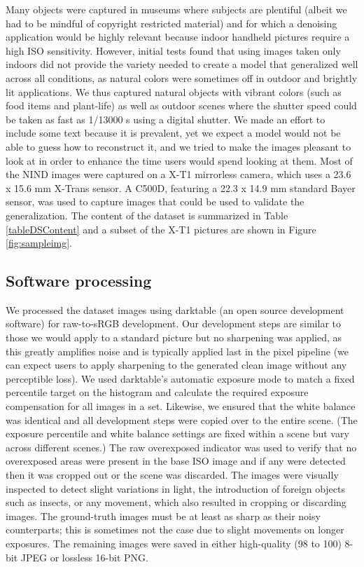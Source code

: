 Many objects were captured in museums where subjects are plentiful (albeit we had to be mindful of copyright restricted material) and for which a denoising application would be highly relevant because indoor handheld pictures require a high ISO sensitivity. However, initial tests found that using images taken only indoors did not provide the variety needed to create a model that generalized well across all conditions, as natural colors were sometimes off in outdoor and brightly lit applications. We thus captured natural objects with vibrant colors (such as food items and plant-life) as well as outdoor scenes where the shutter speed could be taken as fast as 1/13000 s using a digital shutter. We made an effort to include some text because it is prevalent, yet we expect a model would not be able to guess how to reconstruct it, and we tried to make the images pleasant to look at in order to enhance the time users would spend looking at them. Most of the NIND images were captured on a \acl{X-T1} mirrorless camera, which uses a 23.6 x 15.6 mm X-Trans sensor. A \ac{C500D}, featuring a 22.3 x 14.9 mm standard Bayer sensor, was used to capture images that could be used to validate the generalization. The content of the dataset is summarized in Table \ref{tableDSContent} and a subset of the \acs{X-T1} pictures are shown in Figure \ref{fig:sampleimg}.
\subsection{Software processing}
We processed the dataset images using darktable \cite{darktable} (an open source development software) for raw-to-sRGB development. Our development steps are similar to those we would apply to a standard picture but no sharpening was applied, as this greatly amplifies noise and is typically applied last in the pixel pipeline (we can expect users to apply sharpening to the generated clean image without any perceptible loss). We used darktable's automatic exposure mode to match a fixed percentile target on the histogram and calculate the required exposure compensation for all images in a set. Likewise, we ensured that the white balance was identical and all development steps were copied over to the entire scene. (The exposure percentile and white balance settings are fixed within a scene but vary across different scenes.) The raw overexposed indicator was used to verify that no overexposed areas were present in the base ISO image and if any were detected then it was cropped out or the scene was discarded. The images were visually inspected to detect slight variations in light, the introduction of foreign objects such as insects, or any movement, which also resulted in cropping or discarding images. The ground-truth images must be at least as sharp as their noisy counterparts; this is sometimes not the case due to slight movements on longer exposures. The remaining images were saved in either high-quality (98 to 100) 8-bit JPEG or lossless 16-bit PNG.

